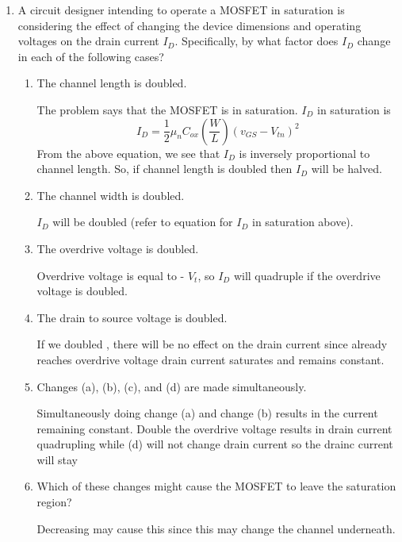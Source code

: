 \begin{enumerate}
    \item A circuit designer intending to operate a MOSFET in saturation is considering the effect of changing the device dimensions and operating voltages on the drain current $I_D$. Specifically, by what factor does $I_D$ change in each of the following cases?
    \begin{enumerate}
        \item The channel length is doubled.
        \begin{Ans}
            The problem says that the MOSFET is in saturation. $I_D$ in saturation is 
                \[I_D = \frac{1}{2} \mu_n C_{ox} (\frac{W}{L}) (v_{GS} - V_{tn})^2\]
            From the above equation, we see that $I_D$ is inversely proportional to channel length. So, if channel length is doubled then $I_D$ will be halved.
        \end{Ans}

        \item The channel width is doubled.
        \begin{Ans}
            $I_D$ will be doubled (refer to equation for $I_D$ in saturation above).
        \end{Ans}

        \item The overdrive voltage is doubled.
        \begin{Ans}
            Overdrive voltage is equal to \vgs - $V_t$, so $I_D$ will quadruple if the overdrive voltage is doubled.
        \end{Ans}

        \item The drain to source voltage is doubled.
        \begin{Ans}
            If we doubled \vds, there will be no effect on the drain current since \vds already reaches overdrive voltage drain current saturates and remains constant.
        \end{Ans}

        \item Changes (a), (b), (c), and (d) are made simultaneously.
        \begin{Ans}
            Simultaneously doing change (a) and change (b) results in the current remaining constant. Double the overdrive voltage results in drain current quadrupling while (d) will not change drain current so the drainc current will stay 
        \end{Ans}

        \item Which of these changes might cause the MOSFET to leave the saturation region?
        \begin{Ans}
            Decreasing \vds may cause this since this may change the channel underneath.
        \end{Ans}
    \end{enumerate}


\end{enumerate}
